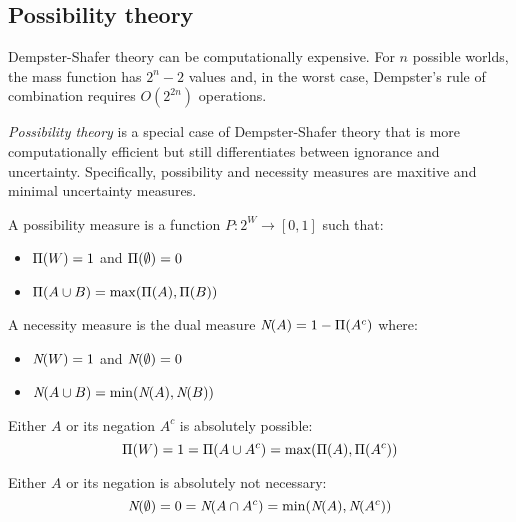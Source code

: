 \subsection{Possibility theory}

Dempster-Shafer theory can be computationally expensive.
For $n$ possible worlds, the mass function has $2^n - 2$ values and, in the
worst case, Dempster's rule of combination requires $O(2^{2n})$ operations.

\emph{Possibility theory} is a special case of Dempster-Shafer theory that is
more computationally efficient but still differentiates between ignorance and
uncertainty.
Specifically, possibility and necessity measures are maxitive and minimal
uncertainty measures.

\begin{dfn}
  \label{def:4:PossibilityNecessity}
  A possibility measure is a function $P : 2^W \to [0, 1]$ such that:
  \begin{itemize}
    \item $\operatorname*{\Pi}(W) = 1$ and $\operatorname*{\Pi}(\emptyset) = 0$
    \item $\operatorname*{\Pi}(A \cup B) = \max(\operatorname*{\Pi}(A), \operatorname*{\Pi}(B))$
  \end{itemize}
  A necessity measure is the dual measure $\textit{N}(A) = 1 - \operatorname*{\Pi}(A^c)$ where:
  \begin{itemize}
    \item $\textit{N}(W) = 1$ and $\textit{N}(\emptyset) = 0$
    \item $\textit{N}(A \cup B) = \min(\textit{N}(A), \textit{N}(B))$
  \end{itemize}
\end{dfn}

\begin{proposition}
  Either $A$ or its negation $A^c$ is absolutely possible:
  \begin{equation}
    \operatorname*{\Pi}(W) = 1 = \operatorname*{\Pi}(A \cup A^c) = \max(\operatorname*{\Pi}(A), \operatorname*{\Pi}(A^c))
  \end{equation}
\end{proposition}

\begin{proposition}
  Either $A$ or its negation is absolutely not necessary:
  \begin{equation}
    \textit{N}(\emptyset) = 0 = \textit{N}(A \cap A^c) = \min(\textit{N}(A), \textit{N}(A^c))
  \end{equation}
\end{proposition}


